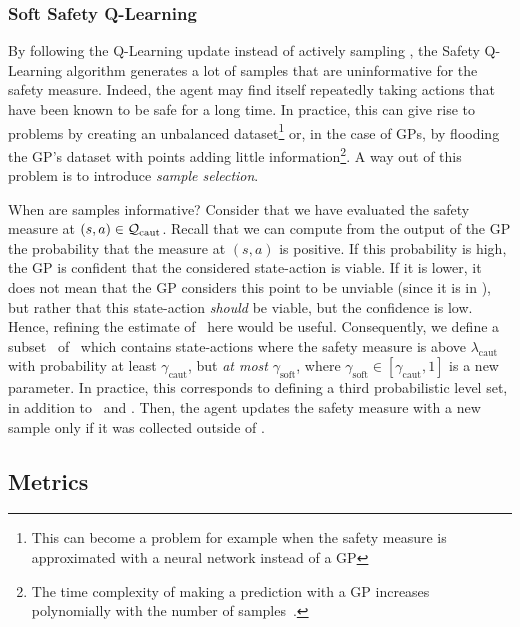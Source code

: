 \subsubsection{Soft Safety Q-Learning}
By following the Q-Learning update instead of actively sampling \LQhat, the Safety Q-Learning algorithm generates a lot of samples that are uninformative for the safety measure. Indeed, the agent may find itself repeatedly taking actions that have been known to be safe for a long time. In practice, this can give rise to problems by creating an unbalanced dataset\footnote{This can become a problem for example when the safety measure is approximated with a neural network instead of a GP} or, in the case of GPs, by flooding the GP's dataset with points adding little information\footnote{The time complexity of making a prediction with a GP increases polynomially with the number of samples~\cite{williams2006gaussian}.}. A way out of this problem is to introduce\emph{ sample selection}. \par
When are samples informative? Consider that we have evaluated the safety measure at $(s, a)\in\mathcal{Q}_\text{caut}$. Recall that we can compute from the output of the GP the probability that the measure at $(s, a)$ is positive. If this probability is high, the GP is confident that the considered state-action is viable. If it is lower, it does not mean that the GP considers this point to be unviable (since it is in \Qcaut), but rather that this state-action\emph{ should} be viable, but the confidence is low. Hence, refining the estimate of \LQhat~here would be useful. Consequently, we define a subset \Qsoft~of \Qcaut~which contains state-actions where the safety measure is above $\lambda_\text{caut}$ with probability at least $\gamma_\text{caut}$, but\emph{ at most} $\gamma_\text{soft}$, where $\gamma_\text{soft}\in[\gamma_\text{caut}, 1]$ is a new parameter. In practice, this corresponds to defining a third probabilistic level set, in addition to \Qcaut~and \Qopt. Then, the agent updates the safety measure with a new sample only if it was collected outside of \Qsoft.%

\subsection{Metrics} \label{sec:metrics}
